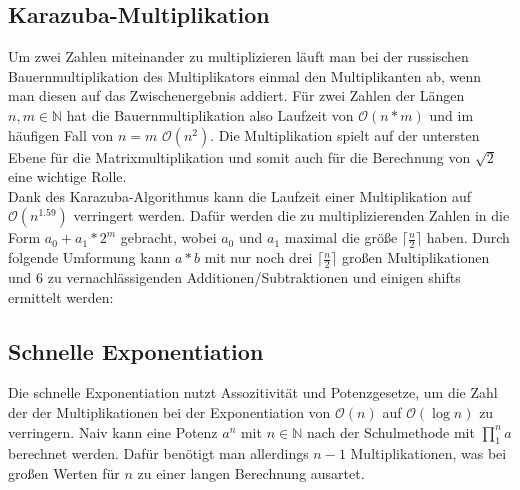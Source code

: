\documentclass[course=erap]{aspdoc}
\begin{document}
\subsection{Karazuba-Multiplikation}
Um zwei Zahlen miteinander zu multiplizieren läuft man bei der russischen Bauernmultiplikation des Multiplikators einmal den Multiplikanten ab, wenn man diesen auf das Zwischenergebnis addiert. 
Für zwei Zahlen der Längen $n, m \in\mathbb{N}$ hat die Bauernmultiplikation also Laufzeit von $\mathcal{O}(n*m)$ und im häufigen Fall von $n=m$ $\mathcal{O}(n^2)$.
Die Multiplikation spielt auf der untersten Ebene für die Matrixmultiplikation und somit auch für die Berechnung von $\sqrt{2}$ eine wichtige Rolle.\\
Dank des Karazuba-Algorithmus kann die Laufzeit einer Multiplikation auf $\mathcal{O}(n^{1.59})$ verringert werden.
Dafür werden die zu multiplizierenden Zahlen in die Form $a_0+a_1*2^m$ gebracht, wobei $a_0$ und $a_1$ maximal die größe $\lceil\frac{n}{2}\rceil$ haben.
Durch folgende Umformung kann $a*b$ mit nur noch drei $\lceil\frac{n}{2}\rceil$ großen Multiplikationen und 6 zu vernachlässigenden Additionen/Subtraktionen und einigen shifts ermittelt werden:

\subsection{Schnelle Exponentiation}
Die schnelle Exponentiation nutzt Assozitivität und Potenzgesetze, um die Zahl der der Multiplikationen bei der Exponentiation von $\mathcal{O}(n)$ auf $\mathcal{O}(\log{}n)$ zu verringern. 
Naiv kann eine Potenz $a^n$ mit $n\in\mathbb{N}$ nach der Schulmethode mit \(\prod_{1}^{n} a \) berechnet werden. 
Dafür benötigt man allerdings $n-1$ Multiplikationen, was bei großen Werten für $n$ zu einer langen Berechnung ausartet.\\
\end{document}
